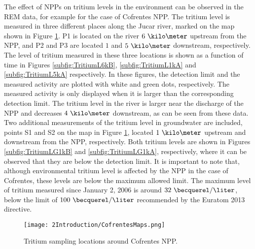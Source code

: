 The effect of NPPs on tritium levels in the environment can be observed in the REM data, for example for the case of Cofrentes NPP. The tritium level is measured in three different places along the Jucar river, marked on the map shown in Figure \ref{fig:SamplingLocations}. P1 is located on the river $6~\kilo\meter$ upstream from the NPP, and P2 and P3 are located $1$ and $5~\kilo\meter$ downstream, respectively. The level of tritium measured in these three locations is shown as a function of time in Figures \ref{subfig:TritiumL6kB}, \ref{subfig:TritiumL1kA} and \ref{subfig:TritiumL5kA} respectively. In these figures, the detection limit and the measured activity are plotted with white and green dots, respectively. The measured activity is only displayed when it is larger than the corresponding detection limit. The tritium level in the river is larger near the discharge of the NPP and decreases $4~\kilo\meter$ downstream, as can be seen from these data. Two additional measurements of the tritium level in groundwater are included, points S1 and S2 on the map in Figure \ref{fig:SamplingLocations}, located $1~\kilo\meter$ upstream and downstream from the NPP, respectively. Both tritium levels are shown in Figures \ref{subfig:TritiumLG1kB} and \ref{subfig:TritiumLG1kA}, respectively, where it can be observed that they are below the detection limit. It is important to note that, although environmental tritium level is affected by the NPP in the case of Cofrentes, these levels are below the maximum allowed limit. The maximum level of tritium measured since January 2, 2006 is around $32~\becquerel/\liter$, below the limit of $100~\becquerel/\liter$ recommended by the Euratom 2013 directive.

\begin{figure}[hbtp]
\texttt{[image: 2Introduction/CofrentesMaps.png]}
\centering
\caption{Tritium sampling locations around Cofrentes NPP.\label{fig:SamplingLocations}}
\end{figure}

